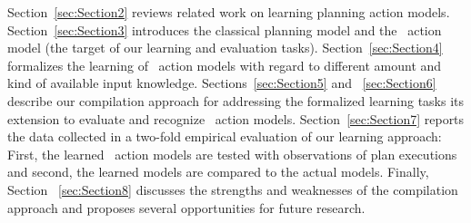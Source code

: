 Section~\ref{sec:Section2} reviews related work on learning planning action models. Section~\ref{sec:Section3} introduces the classical planning model and the \strips\ action model (the target of our learning and evaluation tasks). Section~\ref{sec:Section4} formalizes the learning of \strips\ action models with regard to different amount and kind of available input knowledge. Sections~\ref{sec:Section5} and ~\ref{sec:Section6} describe our compilation approach for addressing the formalized learning tasks its extension to evaluate and recognize \strips\ action models. Section~\ref{sec:Section7} reports the data collected in a two-fold empirical evaluation of our learning approach: First, the learned \strips\ action models are tested with observations of plan executions and second, the learned models are compared to the actual models. Finally, Section ~\ref{sec:Section8} discusses the strengths and weaknesses of the compilation approach and proposes several opportunities for future research.

 
